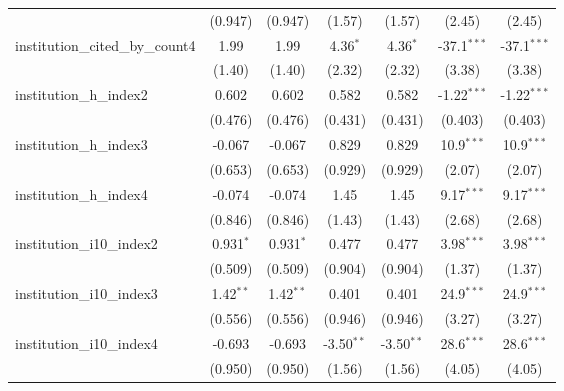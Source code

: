 \begin{tabular}{lcccccc}
                                         & (0.947)       & (0.947)       & (1.57)        & (1.57)        & (2.45)        & (2.45)\\   
   institution\_cited\_by\_count4        & 1.99          & 1.99          & 4.36$^{*}$    & 4.36$^{*}$    & -37.1$^{***}$ & -37.1$^{***}$\\   
                                         & (1.40)        & (1.40)        & (2.32)        & (2.32)        & (3.38)        & (3.38)\\   
   institution\_h\_index2                & 0.602         & 0.602         & 0.582         & 0.582         & -1.22$^{***}$ & -1.22$^{***}$\\   
                                         & (0.476)       & (0.476)       & (0.431)       & (0.431)       & (0.403)       & (0.403)\\   
   institution\_h\_index3                & -0.067        & -0.067        & 0.829         & 0.829         & 10.9$^{***}$  & 10.9$^{***}$\\   
                                         & (0.653)       & (0.653)       & (0.929)       & (0.929)       & (2.07)        & (2.07)\\   
   institution\_h\_index4                & -0.074        & -0.074        & 1.45          & 1.45          & 9.17$^{***}$  & 9.17$^{***}$\\   
                                         & (0.846)       & (0.846)       & (1.43)        & (1.43)        & (2.68)        & (2.68)\\   
   institution\_i10\_index2              & 0.931$^{*}$   & 0.931$^{*}$   & 0.477         & 0.477         & 3.98$^{***}$  & 3.98$^{***}$\\   
                                         & (0.509)       & (0.509)       & (0.904)       & (0.904)       & (1.37)        & (1.37)\\   
   institution\_i10\_index3              & 1.42$^{**}$   & 1.42$^{**}$   & 0.401         & 0.401         & 24.9$^{***}$  & 24.9$^{***}$\\   
                                         & (0.556)       & (0.556)       & (0.946)       & (0.946)       & (3.27)        & (3.27)\\   
   institution\_i10\_index4              & -0.693        & -0.693        & -3.50$^{**}$  & -3.50$^{**}$  & 28.6$^{***}$  & 28.6$^{***}$\\   
                                         & (0.950)       & (0.950)       & (1.56)        & (1.56)        & (4.05)        & (4.05)\\   

\end{tabular}
